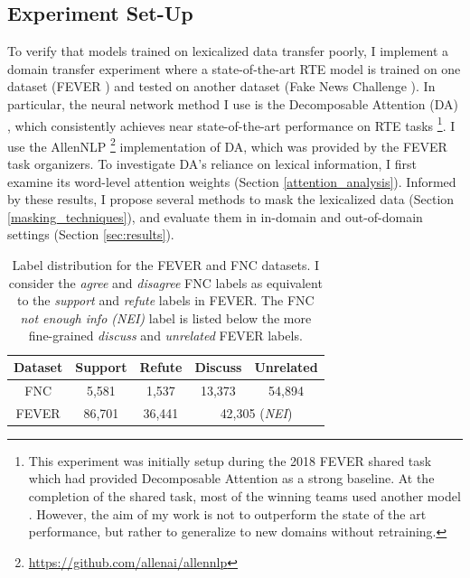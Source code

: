 \documentclass[compsoc,onecolumn]{IEEEtran}
\begin{document}
\subsection{Experiment Set-Up}
 
To verify that models trained on lexicalized data transfer poorly, I implement a domain transfer experiment where a state-of-the-art RTE model is trained on one dataset (FEVER \cite{thorne2018fever}) and tested on another dataset (Fake News Challenge \cite{pomerleau2017fake}). In particular, the neural network method I use is the Decomposable Attention (DA) \cite{parikh2016decomposable}, which consistently achieves near state-of-the-art performance on RTE tasks \footnote{This experiment was initially setup during the 2018 FEVER shared task which had provided Decomposable Attention as a strong baseline. At the completion of the shared task, most of the winning teams used another model \cite{chen2016enhanced}. However, the aim of my work is not to outperform the state of the art performance, but rather to generalize to new domains without retraining.}.  I use the AllenNLP \footnote{\url{https://github.com/allenai/allennlp}}
implementation of DA, which was provided by the FEVER task organizers. To investigate DA's reliance on lexical information, I first examine its word-level attention weights (Section \ref{attention_analysis}). 
Informed by these results, I propose several methods to mask the lexicalized data (Section \ref{masking_techniques}), and evaluate them in in-domain and  out-of-domain settings (Section \ref{sec:results}).




\begin{table}
    \centering
    \footnotesize
    \begin{tabular}{ccccc}
        Dataset & Support & Refute & Discuss & Unrelated \\
        \hline
        FNC    & 5,581 & 1,537  & 13,373 & 54,894 \\
        FEVER  &  86,701 & 36,441  & \multicolumn{2}{c}{42,305 (\textit{NEI})} \\  
    \end{tabular}
    \caption{Label distribution for the FEVER and FNC datasets.  I consider the \textit{agree} and \textit{disagree} FNC labels as equivalent to the \textit{support} and \textit{refute} labels in FEVER. The FNC \textit{not enough info (NEI)} label is listed below the more fine-grained \textit{discuss} and \textit{unrelated} FEVER labels.  }
    \label{tab:data}
\end{table}
\end{document}
